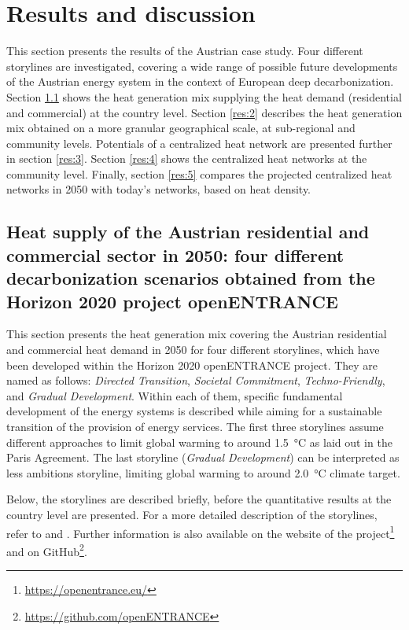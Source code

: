 \section{Results and discussion}\label{results}
This section presents the results of the Austrian case study. Four different storylines are investigated, covering a wide range of possible future developments of the Austrian energy system in the context of European deep decarbonization. Section \ref{res:1} shows the heat generation mix supplying the heat demand (residential and commercial) at the country level. Section \ref{res:2} describes the heat generation mix obtained on a more granular geographical scale, at sub-regional and community levels. Potentials of a centralized heat network are presented further in section \ref{res:3}. Section \ref{res:4} shows the centralized heat networks at the community level. Finally, section \ref{res:5} compares the projected centralized heat networks in 2050 with today's networks, based on heat density.

\subsection{Heat supply of the Austrian residential and commercial sector in 2050: four different decarbonization scenarios obtained from the Horizon 2020 project openENTRANCE}\label{res:1}
This section presents the heat generation mix covering the Austrian residential and commercial heat demand in 2050 for four different storylines, which have been developed within the Horizon 2020 openENTRANCE project. They are named as follows: \textit{Directed Transition}, \textit{Societal Commitment}, \textit{Techno-Friendly}, and \textit{Gradual Development}. Within each of them, specific fundamental development of the energy systems is described while aiming for a sustainable transition of the provision of energy services. The first three storylines assume different approaches to limit global warming to around \SI{1.5}{\degreeCelsius} as laid out in the Paris Agreement. The last storyline (\textit{Gradual Development}) can be interpreted as less ambitions storyline, limiting global warming to around \SI{2.0}{\degreeCelsius} climate target.

Below, the storylines are described briefly, before the quantitative results at the country level are presented. For a more detailed description of the storylines, refer to \cite{auer2020quantitative} and \cite{auer2020development}. Further information is also available on the website of the project\footnote{\url{https://openentrance.eu/}} and on GitHub\footnote{\url{https://github.com/openENTRANCE}}.\vspace{0.3cm}

